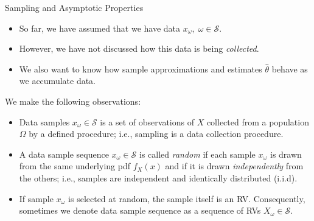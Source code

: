 \documentclass[9pt]{beamer}
\begin{document}
%
\begin{frame}{Sampling and Asymptotic Properties}

\begin{itemize}
\item So far, we have assumed that we have data $x_\omega,\; \omega \in \mathcal{S}$. 
\item However, we have not discussed how this data is being {\em collected}.  
\item We also want to know how sample approximations and estimates $\hat{\theta}$ behave as we accumulate data.  
\end{itemize}
We make the following observations:
\begin{block}{}
\begin{itemize}
\setlength{\itemsep}{10pt}
\item Data samples $x_\omega \in \mathcal{S}$ is a set of observations of $X$ collected from a population $\Omega$ by a defined procedure; i.e., sampling is a data collection procedure. 

\item A data sample sequence $x_\omega \in \mathcal{S}$ is called {\em random} if each sample $x_\omega$ is drawn from the same underlying pdf $f_X(x)$ and if it is drawn {\em independently} from the others; i.e., samples are independent and identically distributed (i.i.d).

\item If sample $x_\omega$ is selected at random, the sample itself is an RV. Consequently, sometimes we denote data sample sequence as a sequence of RVs $X_\omega \in \mathcal{S}$.  

\end{itemize}
\end{block}

\end{frame}
\end{document}
